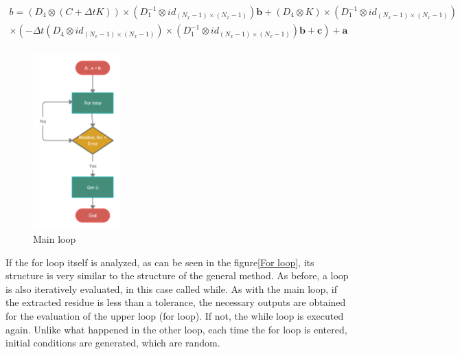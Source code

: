 \documentclass{ws-m3as}
\begin{document}
$$
\begin{array}{c}
b = \left(D_4 \otimes  \left( C + \Delta t K\right) \right) \times \left( D_1^{-1} \otimes  id_{(N_x-1)\times(N_x-1)}\right)  \mathbf{b} +\left( D_4 \otimes   K\right) \times \left( D_1^{-1} \otimes  id_{(N_x-1)\times(N_x-1)}\right)  \\
  \times \left( - \Delta t \left(D_4 \otimes  id_{(N_x-1)\times(N_x-1)} \right) \times \left( D_1^{-1} \otimes  id_{(N_x-1)\times(N_x-1)}\right) \mathbf{b}  + \mathbf{c}  \right) + \mathbf{a} \\
\end{array}
$$



\begin{figure}
\centering
\includegraphics[width=0.30\textwidth]{Main block (1).png}
\caption{Main loop} 
\label{Main loop}
\end{figure}


If the for loop itself is analyzed, as can be seen in the figure\ref{For loop}, its structure is very similar to the structure of the general method. As before, a loop is also iteratively evaluated, in this case called while. As with the main loop, if the extracted residue is less than a tolerance, the necessary outputs are obtained for the evaluation of the upper loop (for loop). If not, the while loop is executed again. Unlike what happened in the other loop, each time the for loop is entered, initial conditions are generated, which are random.
\end{document}
